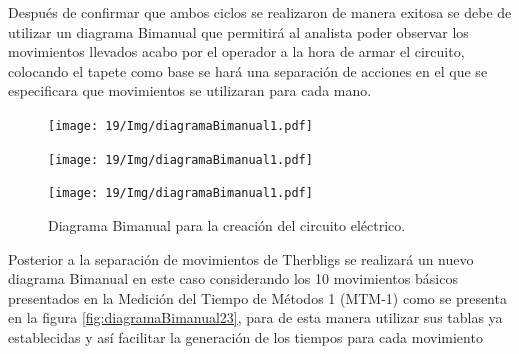     Después de confirmar que ambos ciclos se realizaron de manera exitosa se debe de utilizar un diagrama Bimanual que permitirá al analista poder observar los movimientos llevados acabo por el operador a la hora de armar el circuito, colocando el tapete como base se hará una separación de acciones en el que se especificara que movimientos se utilizaran para cada mano.

    \begin{figure}[H]
        \centering
        \texttt{[image: 19/Img/diagramaBimanual1.pdf]}
        \newpage
        \label{fig:diagramaBimanual11}
    \end{figure}
\begin{figure}[H]
        \centering
        \texttt{[image: 19/Img/diagramaBimanual1.pdf]}
        \newpage
        \label{fig:diagramaBimanual12}
    \end{figure}
    \begin{figure}[H]
        \centering
        \texttt{[image: 19/Img/diagramaBimanual1.pdf]}
        \newpage
        \caption{Diagrama Bimanual para la creación del circuito eléctrico.}
        \label{fig:diagramaBimanual13}
    \end{figure}
    Posterior a la separación de movimientos de Therbligs se realizará un nuevo diagrama Bimanual en este caso considerando los 10 movimientos básicos presentados en la Medición del Tiempo de Métodos 1 (MTM-1) como se presenta en la figura \ref{fig:diagramaBimanual23}, para de esta manera utilizar sus tablas ya establecidas y así facilitar la generación de los tiempos para cada movimiento 
